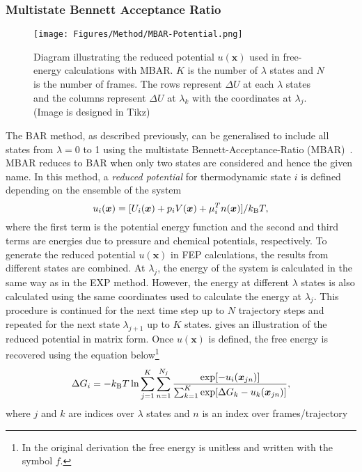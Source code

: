 \subsubsection{Multistate Bennett Acceptance Ratio}
\begin{figure}[t!]
\centering
\texttt{[image: Figures/Method/MBAR-Potential.png]}
\caption{Diagram illustrating the reduced potential $u(\bm{x})$ used in 
free-energy calculations with MBAR. $K$ is the number of $\lambda$ states 
and $N$ is the number of frames. The rows represent $\Delta U$ at each 
$\lambda$ states and the columns represent $\Delta U$ at $\lambda_{k}$ 
with the coordinates at $\lambda_{j}$. (Image is designed in Tikz)}
\label{method:MBAR}
\end{figure}
The BAR method, as described previously, can be generalised to include all states from 
$\lambda=0$ to 1 using the multistate Bennett-Acceptance-Ratio (MBAR)~\cite{Shirts2008}. MBAR 
reduces to BAR when only two states are considered and hence the given name. In this method, 
a {\it reduced potential} for thermodynamic state $i$ is defined depending on the ensemble of 
the system
\begin{equation}
u_{i}(\bm{x}) = [U_{i}(\bm{x}) + p_{i}V(\bm{x}) + \mu_{i}^T n(\bm{x})]/k_{\text{B}}T,
\end{equation}
where the first term is the potential energy function and the second and third terms are 
energies due to pressure and chemical potentials, respectively. To generate the reduced potential 
$u(\bm{x})$ in FEP calculations, the results from different states are combined. At $\lambda_{j}$, 
the energy of the system is calculated in the same way as in the EXP method. However, the energy 
at different $\lambda$ states is also calculated using the same coordinates used to calculate 
the energy at $\lambda_{j}$. This procedure is continued for the next time step up to $N$ 
trajectory steps and repeated for the next state $\lambda_{j+1}$ up to $K$ states. 
 gives an illustration of the reduced potential in matrix form. Once 
$u(\bm{x})$ is defined, the free energy is recovered using the equation below\footnote{In the 
original derivation the free energy is unitless and written with the symbol $f$.}
\begin{equation}
\Delta G_{i} = -k_{\text{B}}T \,\text{ln} \sum_{j=1}^{K}\sum_{n=1}^{N_{j}} \frac{\text{exp}[-u_{i}(\bm{x}_{jn})]}{\sum_{k=1}^{K} \text{exp}[\Delta G_{k}-u_{k}(\bm{x}_{jn})]},
\label{eq:MBAR}
\end{equation}
where $j$ and $k$ are indices over $\lambda$ states and $n$ is an index over frames/trajectory 
